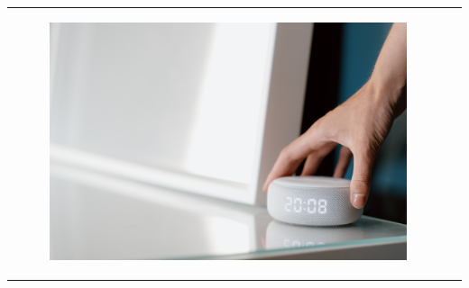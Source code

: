 \begin{frame}{\insertsectionhead}
\begin{table}[H]
\begin{tabular}{lc}
\begin{minipage}{0.45\textwidth}
\begin{figure}[H]
  			\includegraphics[height=0.3\textheight]{images/alexa.jpg}
  		\end{figure}
  	\end{minipage} \\
  	\end{tabular}
  \end{table}
\end{frame}

